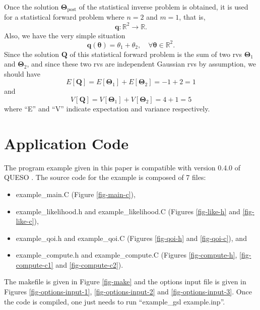 Once the solution $\boldsymbol{\Theta}_{\text{post}}$ of the statistical inverse problem is obtained,
it is used for a statistical forward problem where $n=2$ and $m=1$, that is,
\begin{equation*}
\mathbf{q}:\mathbb{R}^2\rightarrow\mathbb{R}.
\end{equation*}
Also, we have the very simple situation
\begin{equation}\label{eq-example-q}
\mathbf{q}(\boldsymbol{\theta}) = \theta_1+\theta_2,\quad\forall\boldsymbol{\theta}\in\mathbb{R}^2.
\end{equation}
Since the solution $\mathbf{Q}$ of this statistical forward problem is the sum of
two rvs $\boldsymbol{\Theta}_1$ and $\boldsymbol{\Theta}_2$,
and since these two rvs are independent Gaussian rvs by assumption, we should have
\begin{equation}\label{eq-example-E}
E[\mathbf{Q}] = E[\boldsymbol{\Theta}_1] + E[\boldsymbol{\Theta}_2] = -1 + 2 = 1
\end{equation}
and
\begin{equation}\label{eq-example-V}
V[\mathbf{Q}] = V[\boldsymbol{\Theta}_1] + V[\boldsymbol{\Theta}_2] = 4 + 1 = 5
\end{equation}
where ``E'' and ``V'' indicate expectation and variance respectively.

\clearpage
\section{Application Code}

The program example given in this paper is compatible with version 0.4.0 of QUESO \cite{Pr09c}.
The source code for the example is composed of 7 files:
\begin{itemize}
\item example\_main.C (Figure \ref{fig-main-c}),
\item example\_likelihood.h and example\_likelihood.C (Figures \ref{fig-like-h} and \ref{fig-like-c}),
\item example\_qoi.h and example\_qoi.C (Figures \ref{fig-qoi-h} and \ref{fig-qoi-c}), and
\item example\_compute.h and example\_compute.C (Figures \ref{fig-compute-h}, \ref{fig-compute-c1} and \ref{fig-compute-c2}).
\end{itemize}
The makefile is given in Figure \ref{fig-make} and the options input file is given in Figures \ref{fig-options-input-1}, \ref{fig-options-input-2} and \ref{fig-options-input-3}.
Once the code is compiled, one just needs to run ``example\_gsl example.inp''.


